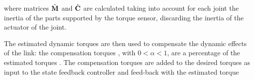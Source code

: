 where matrices $\hat{\mathbf{M}}$ and $\hat{\mathbf{C}}$ are calculated taking into account for each joint the inertia of the parts supported by the torque sensor, discarding the inertia of the actuator of the joint.

The estimated dynamic torques are then used to compensate the dynamic effects of the link: the compensation torques \DIFdelbegin {}\DIFdelend \DIFaddbegin {}\DIFaddend , with $0<\alpha<1$, are a percentage of the estimated torques \DIFdelbegin {}\DIFdelend \DIFaddbegin {}\DIFaddend . The compensation torques are added to the desired torques \DIFdelbegin {}\DIFdelend \DIFaddbegin {}\DIFaddend as input to the state feedback controller and feed-back with the estimated torque \DIFdelbegin {}%

\addtocounter{section}{-1}%
\DIFdelend \DIFaddbegin {}\DIFaddend